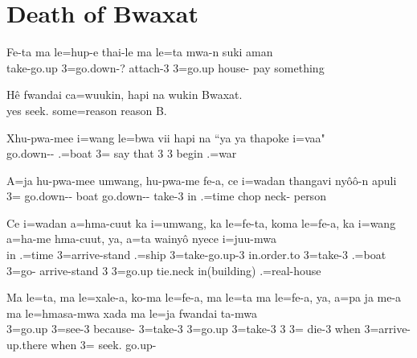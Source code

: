 \section{Death of Bwaxat}

\ea
\gll Fe-ta ma le=hup-e thai-le ma le=ta mwa-n suki aman\\ take-go.up  3=go.down-? attach-3  3=go.up house- pay something\\ \glt {}
\z 

\ea
\gll Hê fwandai ca=wuukin, hapi na wukin Bwaxat. \\ 
yes seek. some=reason   reason B. \\ \glt {} 
\z 

\ea
\gll Xhu-pwa-mee i=wang le=bwa vii hapi na ``ya ya thapoke i=vaa"\\ go.down-- .=boat 3= say that  3 3 begin .=war\\ \glt {}
\z

\ea
\gll A=ja hu-pwa-mee umwang, hu-pwa-me fe-a, ce i=wadan thangavi nyôô-n apuli\\ 3= go.down-- boat go.down-- take-3 in .=time chop neck- person\\ \glt {}
\z \ea

\gll Ce i=wadan a=hma-cuut ka i=umwang, ka le=fe-ta, koma le=fe-a, ka i=wang a=ha-me hma-cuut, ya, a=ta wainyô nyece i=juu-mwa\\ in .=time 3=arrive-stand  .=ship  3=take-go.up-3 in.order.to 3=take-3  .=boat 3=go- arrive-stand 3 3=go.up tie.neck in(building) .=real-house\\ \glt {}
\z 

\ea
\gll Ma le=ta, ma le=xale-a, ko-ma le=fe-a, ma le=ta ma le=fe-a, ya, a=pa ja me-a ma le=hmasa-mwa xada ma le=ja fwandai ta-mwa
 \\  3=go.up  3=see-3 because- 3=take-3  3=go.up  3=take-3 3 3=  die-3 when 3=arrive- up.there when 3= seek. go.up-
 \\ \glt  {} 
\z 

